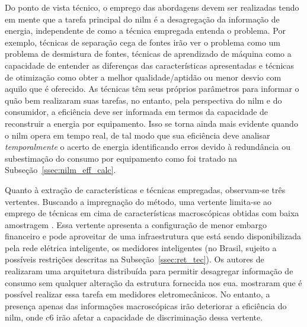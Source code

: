Do ponto de vista técnico, o emprego das abordagens devem ser
realizadas tendo em mente que a tarefa principal do \gls{nilm}
é a desagregação da informação de energia, independente de como a
técnica empregada entenda o problema. Por exemplo, técnicas de separação
cega de fontes irão ver o problema como um problema de desmistura de
fontes, técnicas de aprendizado de máquina como a capacidade de
entender as diferenças das características apresentadas e técnicas de
otimização como obter a melhor qualidade/aptidão ou menor desvio com
aquilo que é oferecido.  As técnicas têm seus próprios parâmetros para
informar o quão bem realizaram suas tarefas, no entanto, pela
perspectiva do \gls{nilm} e do consumidor, a eficiência deve ser
informada em termos da capacidade de reconstruir a energia por
equipamento. Isso se torna ainda mais evidente quando o \gls{nilm} opera
em tempo real, de tal modo que sua eficiência deve analisar
\emph{temporalmente} o acerto de energia identificando erros devido à
redundância ou subestimação do consumo por equipamento como foi tratado
na Subseção~\ref{ssec:nilm_eff_calc}.

Quanto à extração de características e técnicas empregadas, observam-se
três vertentes. Buscando a impregnação do método, uma vertente
limita-se ao emprego de técnicas em cima de características
macroscópicas obtidas com baixa amostragem 
\cite{nilm_hart_1992_8,nilm_cole_data_extraction_1998_14,
nilm_cole_extra_info_surge_1998_15,
nilm_norford_leeb_medianfilt_1996_13,
nilm_leeb_spectral_envelope_1995_23,
nilm_powers_15minsamp_1991_16,
nilm_farinaccio_16ssamp_1999_17,
nilm_marceau_16ssamp_improved_1999_18,
nilm_baranski_genetic_base_2003_19,
nilm_baranski_genetic_detalhado_2004_20,nilm_baranski_summary_2004_21,
nilm_bergman_distribuido_2011,nilm_genetic_2013,nilm_zeifman_vast_2011,
nilm_zeifman_vastext_approach_2012,
nilm_zeifman_statistical_vastext_1stws_2012,
nilm_zeifman_statistical_naive_enduses_2013}. Essa vertente apresenta
a configuração de menor embargo financeiro e pode aproveitar de uma
infraestrutura que está sendo disponibilizada pela rede elétrica
inteligente, os medidores inteligentes (no Brasil, sujeito a possíveis
restrições descritas na Subseção~\ref{ssec:ret_tec}).  Os autores de
\cite{nilm_bergman_distribuido_2011} realizaram uma arquitetura
distribuída para permitir desagregar informação de consumo sem
qualquer alteração da estrutura fornecida nos \gls{eua}.
\cite{nilm_baranski_genetic_base_2003_19,
nilm_baranski_genetic_detalhado_2004_20,nilm_baranski_summary_2004_21}
mostraram que é possível realizar essa tarefa em medidores
eletromecânicos. No entanto, a presença apenas das informações
macroscópicas irão deteriorar a eficiência do \gls{nilm}, onde
\gls{c6} irão afetar a capacidade de discriminação dessa vertente. 

